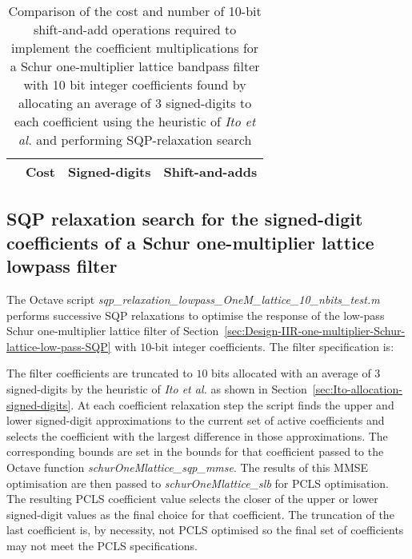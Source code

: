\documentclass[a4paper,twoside,10pt,english]{report}
\begin{document}
\begin{table}[htb]
\centering
\begin{threeparttable}
\begin{tabular}{lccc}  \\ \toprule
& Cost&Signed-digits&Shift-and-adds\\ \midrule

\bottomrule
\end{tabular}
\end{threeparttable}
\caption[Summary of cost results for the Schur one-multiplier lattice 
bandpass filter SQP-relaxation algorithm example with 10 bit coefficients]
{Comparison of the cost and number of 10-bit shift-and-add operations required 
  to implement the coefficient multiplications for a Schur one-multiplier 
  lattice bandpass filter with 10 bit integer coefficients found by allocating 
  an average of 3 signed-digits to each coefficient using the heuristic of 
  \emph{Ito et al.} and performing SQP-relaxation search}
\label{tab:sqp-relax-schurOneMlattice-bandpass-10-nbits-cost-summary}
\end{table}
\subsection{\label{sec:SQP-relaxation-search-signed-digit-coefficients-lowpass}SQP relaxation search for the signed-digit coefficients of a Schur one-multiplier lattice lowpass filter}
The Octave script 
\emph{sqp\_relaxation\_lowpass\_OneM\_lattice\_10\_nbits\_test.m} performs
successive SQP relaxations to optimise the response of the low-pass Schur
one-multiplier lattice filter of
Section~\ref{sec:Design-IIR-one-multiplier-Schur-lattice-low-pass-SQP} with
$10$-bit integer coefficients. The filter specification is:
\begin{small}

\end{small} 

The filter coefficients are truncated to $10$ bits allocated with an average of
$3$ signed-digits by the heuristic of \emph{Ito et al.} as shown in
Section~\ref{sec:Ito-allocation-signed-digits}.  At each coefficient relaxation
step the script finds the upper and lower signed-digit approximations to the
current set of active coefficients and selects the coefficient with the largest
difference in those approximations. The corresponding bounds are set in the
bounds for that coefficient passed to the Octave function
\emph{schurOneMlattice\_sqp\_mmse}. The results of this MMSE optimisation are
then passed to \emph{schurOneMlattice\_slb} for PCLS optimisation. The resulting
PCLS coefficient value selects the closer of the upper or lower signed-digit
values as the final choice for that coefficient. The truncation of the last
coefficient is, by necessity, not PCLS optimised so the final set of
coefficients may not meet the PCLS specifications.
\end{document}
